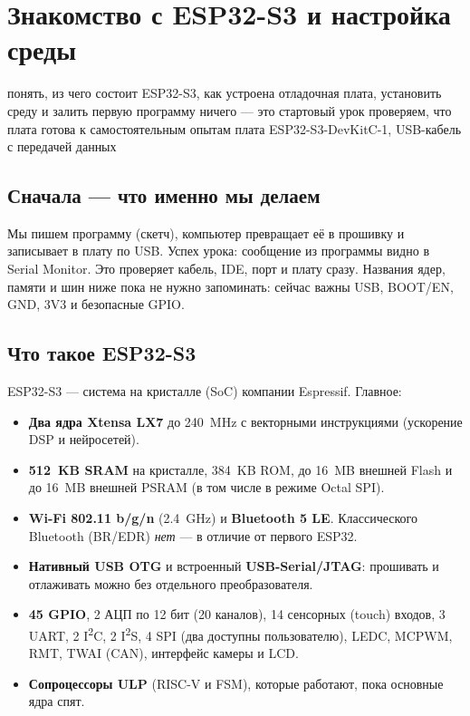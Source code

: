 \section{Знакомство с ESP32-S3 и настройка среды}\label{les:board}\label{les:ide}
\lessonintro
  {понять, из чего состоит ESP32-S3, как устроена отладочная плата, установить среду и залить первую программу}
  {ничего --- это стартовый урок}
  {проверяем, что плата готова к самостоятельным опытам}
  {плата ESP32-S3-DevKitC-1, USB-кабель с передачей данных}

\subsection{Сначала --- что именно мы делаем}

Мы пишем программу (скетч), компьютер превращает её в прошивку и записывает в плату по USB. Успех
урока: сообщение
из программы видно в Serial Monitor. Это проверяет кабель, IDE, порт и плату сразу. Названия ядер,
памяти и шин ниже пока не нужно запоминать: сейчас важны USB, BOOT/EN, GND, 3V3 и безопасные GPIO.

\subsection{Что такое ESP32-S3}

ESP32-S3 --- система на кристалле (SoC) компании Espressif. Главное:

\begin{itemize}
  \item \textbf{Два ядра Xtensa LX7} до \SI{240}{MHz} с векторными инструкциями (ускорение DSP и нейросетей).
  \item \textbf{\SI{512}{KB} SRAM} на кристалле, \SI{384}{KB} ROM, до \SI{16}{MB} внешней Flash и
        до \SI{16}{MB} внешней PSRAM (в том числе в режиме Octal SPI).
  \item \textbf{Wi-Fi 802.11 b/g/n} (\SI{2.4}{GHz}) и \textbf{Bluetooth 5 LE}. Классического Bluetooth (BR/EDR)
        \emph{нет} --- в отличие от первого ESP32.
  \item \textbf{Нативный USB OTG} и встроенный \textbf{USB-Serial/JTAG}: прошивать и отлаживать можно
        без отдельного преобразователя.
  \item \textbf{45 GPIO}, 2 АЦП по 12 бит (20 каналов), 14 сенсорных (touch) входов, 3 UART, 2 I\textsuperscript{2}C,
        2 I\textsuperscript{2}S, 4 SPI (два доступны пользователю), LEDC, MCPWM, RMT, TWAI (CAN), интерфейс камеры и LCD.
  \item \textbf{Сопроцессоры ULP} (RISC-V и FSM), которые работают, пока основные ядра спят.
\end{itemize}

